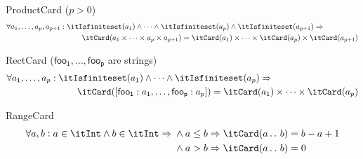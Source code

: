\documentclass[11pt, a4paper, oneside]{article}
\begin{document}
\begin{axioms}
\item[ProductCard ($p > 0$)] \[
        \begin{aligned}
            \forall a_1, \dots, a_p, a_{p + 1} :\; &\itIsfiniteset(a_1) \wedge \dots \wedge \itIsfiniteset(a_p) \wedge \itIsfiniteset(a_{p + 1}) \imp \\
            &\qquad \itCard(a_1 \times \cdots \times a_p \times a_{p + 1}) = \itCard(a_1) \times \cdots \times \itCard(a_p) \times \itCard(a_{p + 1})
        \end{aligned}
    \]

\item[RectCard (\rm$\mathsf{foo_1},\dots,\mathsf{foo_p}$ are strings)] \[
        \begin{aligned}
            \forall a_1, \dots, a_p :\; &\itIsfiniteset(a_1) \wedge \dots \wedge \itIsfiniteset(a_p) \imp \\
            &\qquad \itCard(\bx{ \mathsf{foo_1} : a_1, \dots, \mathsf{foo_p} : a_p }) = \itCard(a_1) \times \cdots \times \itCard(a_p)
        \end{aligned}
    \]

\item[RangeCard] \[
        \forall a, b : a \in \itInt \wedge b \in \itInt \imp \begin{aligned}[t]
            &\wedge a \le b \imp \itCard(a \ltwodots b) = b - a + 1 \\
            &\wedge a > b \imp \itCard(a \ltwodots b) = 0
        \end{aligned}
    \]

\end{axioms}
\end{document}
